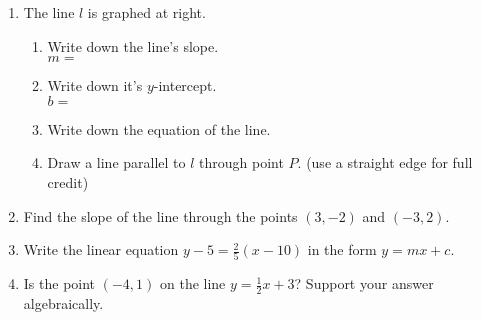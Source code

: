 \begin{enumerate}
\item The line $l$ is graphed at right.
  \begin{multicols}{2}
  \begin{enumerate}
    \item Write down the line's slope.\\ $m=$
    \vspace{0.5cm}
    \item Write down it's $y$-intercept.\\ $b=$
    \vspace{0.5cm}
    \item Write down the equation of the line.
    \vspace{1.5cm}
    \item Draw a line parallel to $l$ through point $P$. (use a straight edge for full credit)
  \end{enumerate} \vspace{.5cm}
    \begin{center} 
    \end{center}
  \end{multicols}

\item Find the slope of the line through the points $(3, -2)$ and $(-3, 2)$. \vspace{4cm}

\item Write the linear equation $\displaystyle y-5=\frac{2}{5}(x-10)$ in the form $y=mx+c$. \vspace{4cm}

\item Is the point $(-4,1)$ on the line $\displaystyle y=\frac{1}{2}x+3$? Support your answer algebraically.


\end{enumerate}
